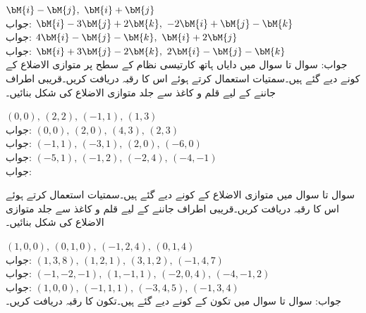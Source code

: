 \quad
$\bM{i}-\bM{j},\,\, \bM{i}+\bM{j}$\\
جواب:
\quad
$\bM{i}-3\bM{j}+2\bM{k},\,\, -2\bM{i}+\bM{j}-\bM{k}$\\
جواب:
\quad
$4\bM{i}-\bM{j}-\bM{k},\,\, \bM{i}+2\bM{j}$\\
جواب:
\quad
$\bM{i}+3\bM{j}-2\bM{k},\,\, 2\bM{i}-\bM{j}-\bM{k}$\\
جواب:
سوال  تا سوال  میں دایاں ہاتھ کارتیسی نظام کے  سطح پر متوازی الاضلاع کے کونے دیے گئے ہیں۔سمتیات استعمال کرتے ہوئے اس کا رقبہ دریافت کریں۔قریبی اطراف جاننے کے لیے قلم و کاغذ سے  جلد متوازی الاضلاع کی شکل بنائیں۔

\quad
$(0,0), \, (2,2), \, (-1,1), \, (1,3)$\\
جواب:
\quad
$(0,0),\, (2,0),\, (4,3),\,(2,3)$\\
جواب:
\quad
$(-1,1), \, (-3,1), \, (2,0), \, (-6,0)$\\
جواب:
\quad
$(-5,1), \, (-1,2), \, (-2,4), \, (-4,-1)$\\
جواب:

سوال  تا سوال  میں متوازی الاضلاع کے کونے دیے گئے ہیں۔سمتیات استعمال کرتے ہوئے اس کا رقبہ دریافت کریں۔قریبی اطراف جاننے کے لیے قلم و کاغذ سے  جلد متوازی الاضلاع کی شکل بنائیں۔

\quad
$(1,0,0), \, (0,1,0),\, (-1,2,4), \, (0,1,4)$\\
جواب:
\quad
$(1,3,8), \, (1,2,1),\, (3,1,2), \, (-1,4,7)$\\
جواب:
\quad
$(-1,-2,-1), \, (1,-1,1),\, (-2,0,4), \, (-4,-1,2)$\\
جواب:
\quad
$(1,0,0), \, (-1,1,1),\, (-3,4,5), \, (-1,3,4)$\\
جواب:
سوال  تا سوال  میں تکون کے کونے دیے گئے ہیں۔تکون کا رقبہ دریافت کریں۔

